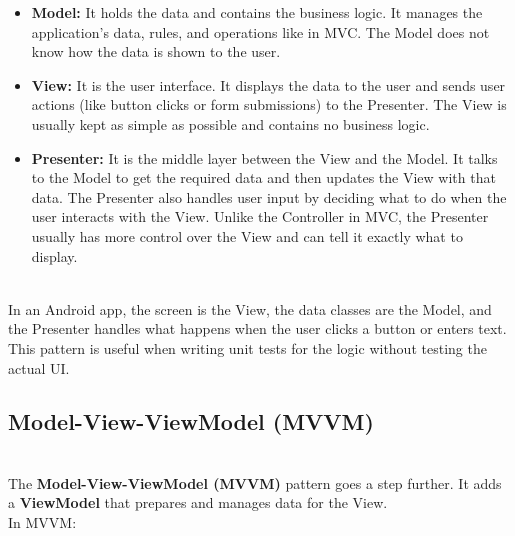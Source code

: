 \begin{itemize}
\item
\protect{}\label{ljIE7InVXvNgUKHZski0h}
\textbf{Model:} It holds the data and contains the business logic. It manages the application's data, rules, and operations like in MVC. The Model does not know how the data is shown to the user.
\item
\protect{}\label{LNu0hOSTGn6Wr7A8DSdzM}
\textbf{View:} It is the user interface. It displays the data to the user and sends user actions (like button clicks or form submissions) to the Presenter. The View is usually kept as simple as possible and contains no business logic.
\item
\protect{}\label{TmB98Vdo1OFRuHN1y2Grs}
\textbf{Presenter:} It is the middle layer between the View and the Model. It talks to the Model to get the required data and then updates the View with that data. The Presenter also handles user input by deciding what to do when the user interacts with the View. Unlike the Controller in MVC, the Presenter usually has more control over the View and can tell it exactly what to display.
\end{itemize}
\\
In an Android app, the screen is the View, the data classes are the Model, and the Presenter handles what happens when the user clicks a button or enters text. This pattern is useful when writing unit tests for the logic without testing the actual UI.

\subsection{Model-View-ViewModel (MVVM)}\label{0JDw6qDtWyklzhV8D8ScJ}
\\
The \textbf{Model-View-ViewModel (MVVM)} pattern goes a step further. It adds a \textbf{ViewModel} that prepares and manages data for the View.
\\
In MVVM:

